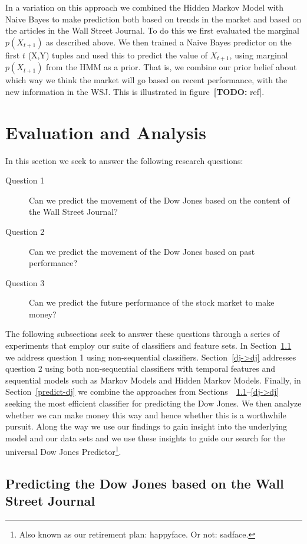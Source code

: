 \documentclass[10pt]{article}
\def\TODO#1{\noindent\textbf{[TODO:} #1]}
\begin{document}
In a variation on this approach we combined the Hidden Markov Model with Naive Bayes to make prediction both based on trends in the market and based on the articles in the Wall Street Journal.
To do this we first evaluated the marginal $p(X_{t+1})$ as described above.
We then trained a Naive Bayes predictor on the first $t$ (X,Y) tuples and used this to predict the value of $X_{t+1}$, using marginal $p(X_{t+1})$ from the HMM as a prior.
That is, we combine our prior belief about which way we think the market will go based on recent performance, with the new information in the WSJ.
This is illustrated in figure~\TODO{ref}. 


\section{Evaluation and Analysis}

In this section we seek to answer the following research questions:
\begin{description}
\item[Question 1] Can we predict the movement of the Dow Jones based on the content of the Wall Street Journal?
\item[Question 2] Can we predict the movement of the Dow Jones based on past performance?
\item[Question 3] Can we predict the future performance of the stock market to make money?
\end{description}

The following subsections seek to answer these questions through a series of experiments that employ our suite of classifiers and feature sets.
In Section~\ref{wsj->dj} we address question 1 using non-sequential classifiers.
Section~\ref{dj->dj} addresses question 2 using both non-sequential classifiers with temporal features and sequential models such as Markov Models and Hidden Markov Models.
Finally, in Section~\ref{predict-dj} we combine the approaches from Sections~~\ref{wsj->dj}--\ref{dj->dj} seeking the most efficient classifier for predicting the Dow Jones.
We then analyze whether we can make money this way and hence whether this is a worthwhile pursuit. 
Along the way we use our findings to gain insight into the underlying model and our data sets and we use these insights to guide our search for the universal Dow Jones Predictor\footnote{Also known as our retirement plan: happyface. Or not: sadface.}.


\subsection{Predicting the Dow Jones based on the Wall Street Journal}
\label{wsj->dj}
\end{document}
